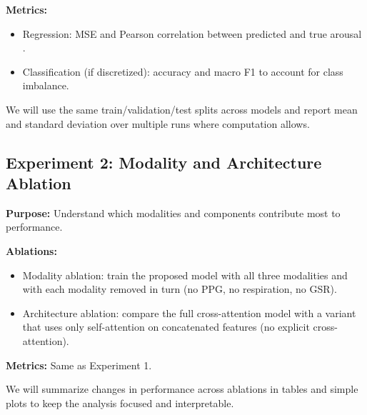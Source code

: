 \documentclass[11pt]{article}
\begin{document}
\textbf{Metrics:}
\begin{itemize}[leftmargin=1.4em]
  \item Regression: MSE and Pearson correlation between predicted and true arousal \cite{galvao_predicting_2021,choi_arousal_2018}.
  \item Classification (if discretized): accuracy and macro F1 to account for class imbalance.
\end{itemize}

We will use the same train/validation/test splits across models and report mean and standard deviation over multiple runs where computation allows.

\subsection{Experiment 2: Modality and Architecture Ablation}
\textbf{Purpose:} Understand which modalities and components contribute most to performance.

\textbf{Ablations:}
\begin{itemize}[leftmargin=1.4em]
  \item Modality ablation: train the proposed model with all three modalities and with each modality removed in turn (no PPG, no respiration, no GSR).
  \item Architecture ablation: compare the full cross-attention model with a variant that uses only self-attention on concatenated features (no explicit cross-attention).
\end{itemize}

\textbf{Metrics:} Same as Experiment 1.

We will summarize changes in performance across ablations in tables and simple plots to keep the analysis focused and interpretable.



\end{document}
